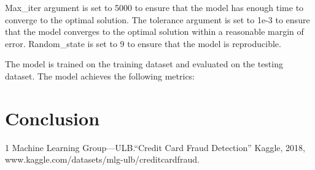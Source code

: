\documentclass[12pt, letterpaper]{article}
\begin{document}
        Max\_iter argument is set to 5000 to ensure that the model has enough time to converge to the optimal solution. The tolerance argument is set to 1e-3 to ensure that the model converges to the optimal solution within a reasonable margin of error. Random\_state is set to 9 to ensure that the model is reproducible.

        The model is trained on the training dataset and evaluated on the testing dataset. The model achieves the following metrics:
    
\section{Conclusion}
    
\begin{thebibliography} {1}
    Machine Learning Group---ULB.\@ “Credit Card Fraud Detection” Kaggle, 2018, www.kaggle.com/datasets/mlg-ulb/creditcardfraud.
    
\end{thebibliography}
    
\end{document}
